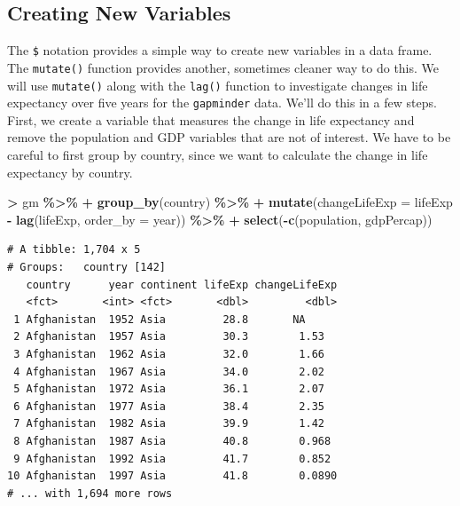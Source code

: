 \documentclass[
]{krantz}
\makeatletter
\newenvironment{Shaded}{\begin{snugshade}}{\end{snugshade}}
\newcommand{\DataTypeTok}[1]{\textcolor[rgb]{0.27,0.27,0.27}{#1}}
\newcommand{\KeywordTok}[1]{\textcolor[rgb]{0.27,0.27,0.27}{\textbf{#1}}}
\newcommand{\NormalTok}[1]{#1}
\newcommand{\OperatorTok}[1]{\textcolor[rgb]{0.43,0.43,0.43}{\textbf{#1}}}
\newcommand{\StringTok}[1]{\textcolor[rgb]{0.5,0.5,0.5}{#1}}
\newenvironment{kframe}{%
\medskip{}
\setlength{\fboxsep}{.8em}
 \def\at@end@of@kframe{}%
 \ifinner\ifhmode%
  \def\at@end@of@kframe{\end{minipage}}%
  \begin{minipage}{\columnwidth}%
 \fi\fi%
 \def\FrameCommand##1{\hskip\@totalleftmargin \hskip-\fboxsep
 \colorbox{shadecolor}{##1}\hskip-\fboxsep
     \hskip-\linewidth \hskip-\@totalleftmargin \hskip\columnwidth}%
 \MakeFramed {\advance\hsize-\width
   \@totalleftmargin\z@ \linewidth\hsize
   \@setminipage}}%
 {\par\unskip\endMakeFramed%
 \at@end@of@kframe}
\renewenvironment{Shaded}{\begin{kframe}}{\end{kframe}}
\makeatother
\begin{document}
\hypertarget{creating-new-variables}{%
\subsection{Creating New Variables}\label{creating-new-variables}}

The \texttt{\$} notation provides a simple way to create new variables in a data frame. The \texttt{mutate()} function provides another, sometimes cleaner way to do this. We will use \texttt{mutate()} along with the \texttt{lag()} function to investigate changes in life expectancy over five years for the \texttt{gapminder} data. We'll do this in a few steps. First, we create a variable that measures the change in life expectancy and remove the population and GDP variables that are not of interest. We have to be careful to first group by country, since we want to calculate the change in life expectancy by country.

\begin{Shaded}
\begin{Highlighting}[]
\OperatorTok{\textgreater{}}\StringTok{ }\NormalTok{gm }\OperatorTok{\%\textgreater{}\%}\StringTok{ }
\OperatorTok{+}\StringTok{   }\KeywordTok{group\_by}\NormalTok{(country) }\OperatorTok{\%\textgreater{}\%}\StringTok{ }
\OperatorTok{+}\StringTok{   }\KeywordTok{mutate}\NormalTok{(}\DataTypeTok{changeLifeExp =}\NormalTok{ lifeExp }\OperatorTok{{-}}\StringTok{ }\KeywordTok{lag}\NormalTok{(lifeExp, }\DataTypeTok{order\_by =}\NormalTok{ year)) }\OperatorTok{\%\textgreater{}\%}\StringTok{ }
\OperatorTok{+}\StringTok{   }\KeywordTok{select}\NormalTok{(}\OperatorTok{{-}}\KeywordTok{c}\NormalTok{(population, gdpPercap))}
\end{Highlighting}
\end{Shaded}

\begin{verbatim}
# A tibble: 1,704 x 5
# Groups:   country [142]
   country      year continent lifeExp changeLifeExp
   <fct>       <int> <fct>       <dbl>         <dbl>
 1 Afghanistan  1952 Asia         28.8       NA     
 2 Afghanistan  1957 Asia         30.3        1.53  
 3 Afghanistan  1962 Asia         32.0        1.66  
 4 Afghanistan  1967 Asia         34.0        2.02  
 5 Afghanistan  1972 Asia         36.1        2.07  
 6 Afghanistan  1977 Asia         38.4        2.35  
 7 Afghanistan  1982 Asia         39.9        1.42  
 8 Afghanistan  1987 Asia         40.8        0.968 
 9 Afghanistan  1992 Asia         41.7        0.852 
10 Afghanistan  1997 Asia         41.8        0.0890
# ... with 1,694 more rows
\end{verbatim}
\end{document}
